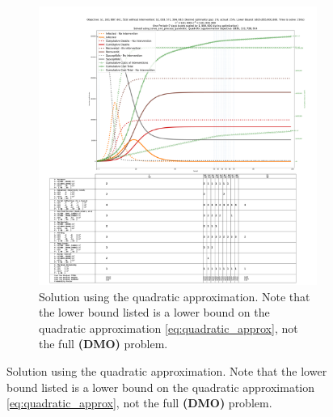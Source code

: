 \documentclass{article}
\newcommand{\model}{{\bf (DMO) }}
\begin{document}
\begin{figure}[H]\ContinuedFloat
    \begin{subfigure}{\textwidth}
        \begin{center}
            \includegraphics[width=1.2\linewidth]{figures/heuristic_solutions/system_state_vs_time_T100_baron__solve_and_process_quadratic.pdf}
        \end{center}
        \caption{Solution using the quadratic approximation. Note that the lower bound listed is a lower bound on the quadratic approximation \eqref{eq:quadratic_approx}, not the full \model problem.}\label{fig:heuristic_quadratic}
    \end{subfigure}
\end{figure}
\end{document}
